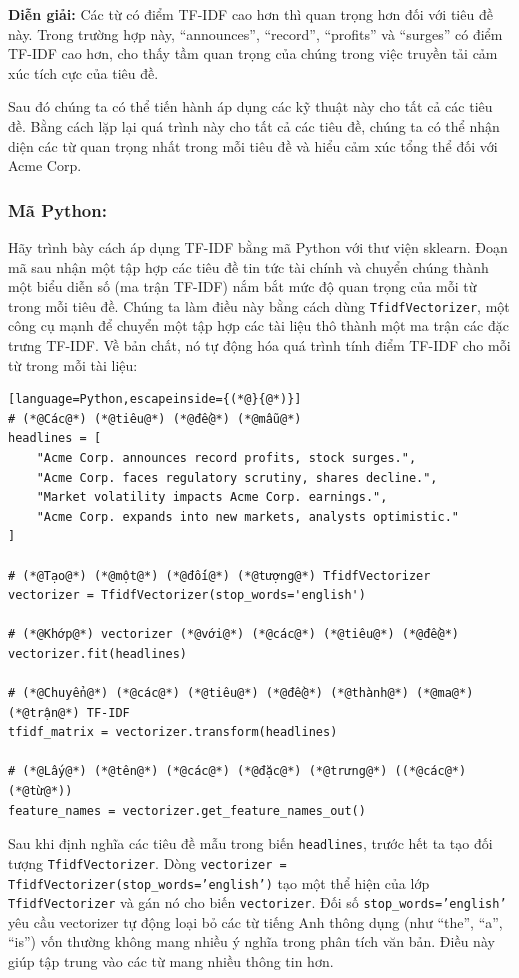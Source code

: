 \textbf{Diễn giải:} Các từ có điểm TF-IDF cao hơn thì quan trọng hơn đối với tiêu đề này. Trong trường hợp này, ``announces'', ``record'', ``profits'' và ``surges'' có điểm TF-IDF cao hơn, cho thấy tầm quan trọng của chúng trong việc truyền tải cảm xúc tích cực của tiêu đề.

Sau đó chúng ta có thể tiến hành áp dụng các kỹ thuật này cho tất cả các tiêu đề. Bằng cách lặp lại quá trình này cho tất cả các tiêu đề, chúng ta có thể nhận diện các từ quan trọng nhất trong mỗi tiêu đề và hiểu cảm xúc tổng thể đối với Acme Corp.

\subsubsection*{Mã Python:}

Hãy trình bày cách áp dụng TF-IDF bằng mã Python với thư viện sklearn. Đoạn mã sau nhận một tập hợp các tiêu đề tin tức tài chính và chuyển chúng thành một biểu diễn số (ma trận TF-IDF) nắm bắt mức độ quan trọng của mỗi từ trong mỗi tiêu đề. Chúng ta làm điều này bằng cách dùng \texttt{TfidfVectorizer}, một công cụ mạnh để chuyển một tập hợp các tài liệu thô thành một ma trận các đặc trưng TF-IDF. Về bản chất, nó tự động hóa quá trình tính điểm TF-IDF cho mỗi từ trong mỗi tài liệu:

\begin{lstlisting}[language=Python,escapeinside={(*@}{@*)}]
# (*@Các@*) (*@tiêu@*) (*@đề@*) (*@mẫu@*)
headlines = [
    "Acme Corp. announces record profits, stock surges.",
    "Acme Corp. faces regulatory scrutiny, shares decline.",
    "Market volatility impacts Acme Corp. earnings.",
    "Acme Corp. expands into new markets, analysts optimistic."
]

# (*@Tạo@*) (*@một@*) (*@đối@*) (*@tượng@*) TfidfVectorizer
vectorizer = TfidfVectorizer(stop_words='english')

# (*@Khớp@*) vectorizer (*@với@*) (*@các@*) (*@tiêu@*) (*@đề@*)
vectorizer.fit(headlines)

# (*@Chuyển@*) (*@các@*) (*@tiêu@*) (*@đề@*) (*@thành@*) (*@ma@*) (*@trận@*) TF-IDF
tfidf_matrix = vectorizer.transform(headlines)

# (*@Lấy@*) (*@tên@*) (*@các@*) (*@đặc@*) (*@trưng@*) ((*@các@*) (*@từ@*))
feature_names = vectorizer.get_feature_names_out()
\end{lstlisting}

Sau khi định nghĩa các tiêu đề mẫu trong biến \texttt{headlines}, trước hết ta tạo đối tượng \texttt{TfidfVectorizer}. Dòng \texttt{vectorizer = TfidfVectorizer(stop\_words='english')} tạo một thể hiện của lớp \texttt{TfidfVectorizer} và gán nó cho biến \texttt{vectorizer}. Đối số \texttt{stop\_words='english'} yêu cầu vectorizer tự động loại bỏ các từ tiếng Anh thông dụng (như ``the'', ``a'', ``is'') vốn thường không mang nhiều ý nghĩa trong phân tích văn bản. Điều này giúp tập trung vào các từ mang nhiều thông tin hơn.

